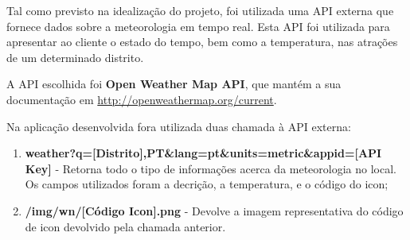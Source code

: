 Tal como previsto na idealização do projeto, foi utilizada uma API externa que fornece dados sobre a meteorologia em tempo real. Esta API foi utilizada para apresentar ao cliente o estado do tempo, bem como a temperatura, nas atrações de um determinado distrito.

A API escolhida foi \textbf{Open Weather Map API}, que mantém a sua documentação em \url{http://openweathermap.org/current}.

Na aplicação desenvolvida fora utilizada duas chamada à API externa:

\begin{enumerate}
    \item \textbf{weather?q=[Distrito],PT\&lang=pt\&units=metric\&appid=[API Key]} - Retorna todo o tipo de informações acerca da meteorologia no local. Os campos utilizados foram a decrição, a temperatura, e o código do icon;
    \item \textbf{/img/wn/[Código Icon].png} - Devolve a imagem representativa do código de icon devolvido pela chamada anterior.
\end{enumerate}
